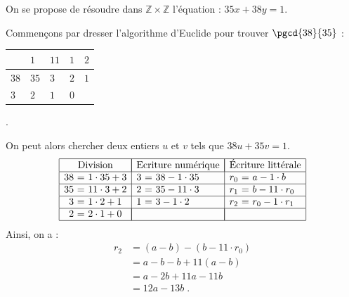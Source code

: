             \begin{ex}
                  On se propose de r\'esoudre dans $\mathbb{Z}\times\mathbb{Z}$ l'\'equation : 
                  $35 x + 38 y = 1$.
                  
                  Commen\c{c}ons par dresser l'algorithme d'Euclide pour trouver $\pgcd{38}{35}$ : \ 
                  \begin{tabular}{|l|l|l|l|l|} 
                  \hline
                             & $1$  & $11$ & $1$ & $2$ \\ 
                  \hline
                        $38$ & $35$ & $3$  & $2$ & $1$ \\ 
                  \hline
                        $3$  & $2$  & $1$  & $0$ &     \\
                  \hline
                  \end{tabular} .
                  
                  On peut alors chercher deux entiers $u$ et $v$ tels que $38 u + 35 v = 1$.
                                    \begin{displaymath}
                        \begin{array}{|r@{\ =\ }l|r@{\ =\ }l|r@{\ =\ }l|}
                              \hline
                              \multicolumn{2}{|c|}{\text{Division}} &
                                     \multicolumn{2}{|c|}{\text{Ecriture num\'erique} } & 
                                           \multicolumn{2}{|c|}{\text{\'Ecriture litt\'erale} } \\
                              \hline
                              38  & 1 \cdot 35 + 3 & 3 & 38 - 1 \cdot 35       & r_0  & a   - 1 \cdot b    \\
                              \hline
                              35  & 11 \cdot 3 + 2 & 2 & 35  - 11 \cdot 3      & r_1  & b   - 11 \cdot r_0 \\
                              \hline
                              3   & 1 \cdot 2 + 1  & 1  & 3  - 1 \cdot 2       & r_2  & r_0 - 1 \cdot r_1  \\
                              \hline
                              2  & 2 \cdot 1  + 0  & \multicolumn{2}{|c|}{}      & \multicolumn{2}{|c|}{}  \\
                              \hline
                        \end{array}
                  \end{displaymath}
                  Ainsi, on a : 
                        \begin{align*}
                              r_2 & = (a - b ) - (b - 11 \cdot r_0) \\
                                  & = a - b - b + 11 (a - b)        \\
                                  & = a - 2 b + 11 a - 11 b         \\
                                  & = 12 a - 13 b                   \;.
                        \end{align*}
                  

\end{ex}
